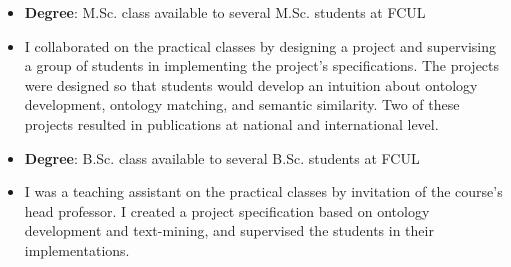 \begin{itemize}
    \item \textbf{Degree}: M.Sc. class available to several M.Sc. students at FCUL
    \item I collaborated on the practical classes by designing a project and supervising a group of students in implementing the project's specifications. The projects were designed so that students would develop an intuition about ontology development, ontology matching, and semantic similarity. Two of these projects resulted in publications at national and international level.
\end{itemize}

\begin{itemize}
    \item \textbf{Degree}: B.Sc. class available to several B.Sc. students at FCUL
    \item I was a teaching assistant on the practical classes by invitation of the course's head professor. I created a project specification based on ontology development and text-mining, and supervised the students in their implementations.
\end{itemize}


